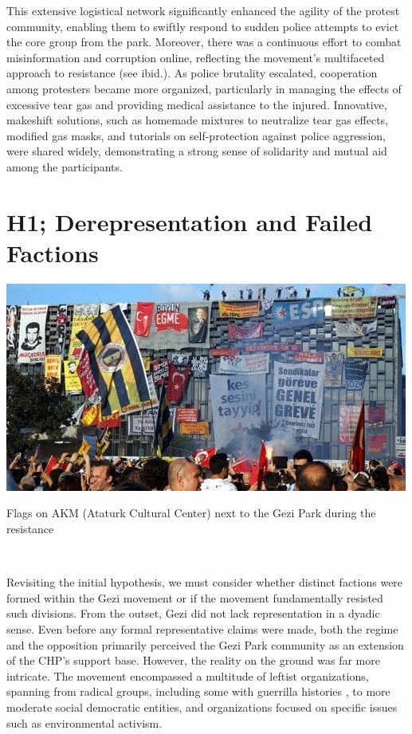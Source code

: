 This extensive logistical network significantly enhanced the agility of the protest community, enabling them to swiftly respond to sudden police attempts to evict the core group from the park. Moreover, there was a continuous effort to combat misinformation and corruption online, reflecting the movement’s multifaceted approach to resistance (see ibid.). As police brutality escalated, cooperation among protesters became more organized, particularly in managing the effects of excessive tear gas and providing medical assistance to the injured. Innovative, makeshift solutions, such as homemade mixtures to neutralize tear gas effects, modified gas masks, and tutorials on self-protection against police aggression, were shared widely, demonstrating a strong sense of solidarity and mutual aid among the participants.

\section{H1; Derepresentation and Failed Factions}
\begin{marginfigure}

  \includegraphics[scale=0.3]{bayrak.jpg}
  \caption{Flags on AKM (Ataturk Cultural Center) next to the Gezi Park during
  the resistance}\\
\end{marginfigure}


Revisiting the initial hypothesis, we must consider whether distinct factions were formed within the Gezi movement or if the movement fundamentally resisted such divisions. From the outset, Gezi did not lack representation in a dyadic sense. Even before any formal representative claims were made, both the regime and the opposition primarily perceived the Gezi Park community as an extension of the CHP's support base. However, the reality on the ground was far more intricate. The movement encompassed a multitude of leftist organizations, spanning from radical groups, including some with guerrilla histories , to more moderate social democratic entities, and organizations focused on specific issues such as environmental activism.

